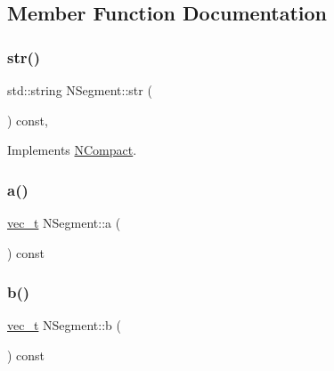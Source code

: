 \subsection{Member Function Documentation}
\mbox{\label{class_n_segment_a15514dec8420dd1aafda38e7327c9be0}} 
\subsubsection{\texorpdfstring{str()}{str()}}
{\footnotesize\ttfamily std\+::string N\+Segment\+::str (\begin{DoxyParamCaption}{ }\end{DoxyParamCaption}) const\hspace{0.3cm}{\ttfamily [override]}, {\ttfamily [virtual]}}



Implements \mbox{\hyperlink{class_n_compact_af1879d7342bf6d9902ed5473f6e89038}{N\+Compact}}.

\mbox{\label{class_n_segment_a7a4eccaa9a0746ef758efdde1bfbbd65}} 
\subsubsection{\texorpdfstring{a()}{a()}}
{\footnotesize\ttfamily \mbox{\hyperlink{group___n_algebra_ga0a2cfc67e738a3d73e4f12098c4c07f6}{vec\+\_\+t}} N\+Segment\+::a (\begin{DoxyParamCaption}{ }\end{DoxyParamCaption}) const}

\mbox{\label{class_n_segment_aa782c4870899db28cae39616edc86967}} 
\subsubsection{\texorpdfstring{b()}{b()}}
{\footnotesize\ttfamily \mbox{\hyperlink{group___n_algebra_ga0a2cfc67e738a3d73e4f12098c4c07f6}{vec\+\_\+t}} N\+Segment\+::b (\begin{DoxyParamCaption}{ }\end{DoxyParamCaption}) const}

\mbox{\label{class_n_segment_a423242ff6d7d28acbf6bb0fffb559163}} 
